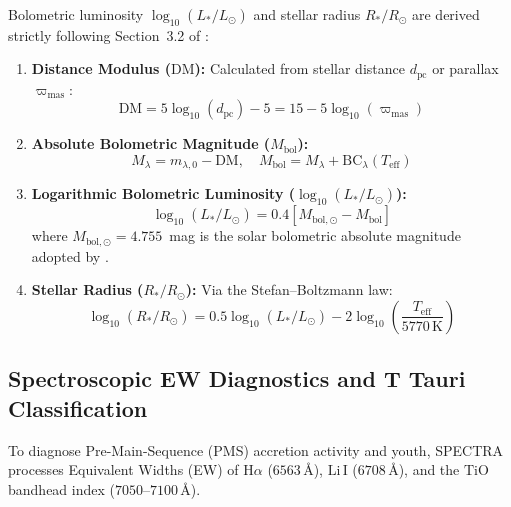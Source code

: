 \documentclass[fleqn,usenatbib]{mnras}
\begin{document}
Bolometric luminosity $\log_{10}(L_*/L_\odot)$ and stellar radius $R_*/R_\odot$ are derived strictly following Section~3.2 of \citet{bell2014pre}:
\begin{enumerate}
    \item \textbf{Distance Modulus ($\text{DM}$):} Calculated from stellar distance $d_{\text{pc}}$ or parallax $\varpi_{\text{mas}}$:
    \begin{equation}
        \text{DM} = 5 \log_{10}(d_{\text{pc}}) - 5 = 15 - 5 \log_{10}(\varpi_{\text{mas}})
        \label{eq:dm}
    \end{equation}
    \item \textbf{Absolute Bolometric Magnitude ($M_{\text{bol}}$):}
    \begin{equation}
        M_\lambda = m_{\lambda,0} - \text{DM}, \quad M_{\text{bol}} = M_\lambda + \text{BC}_\lambda(T_{\text{eff}})
        \label{eq:mbol}
    \end{equation}
    \item \textbf{Logarithmic Bolometric Luminosity ($\log_{10}(L_*/L_\odot)$):}
    \begin{equation}
        \log_{10}(L_*/L_\odot) = 0.4 \left[ M_{\text{bol},\odot} - M_{\text{bol}} \right]
        \label{eq:logl}
    \end{equation}
    where $M_{\text{bol},\odot} = 4.755$~mag is the solar bolometric absolute magnitude adopted by \citet{bell2014pre}.
    \item \textbf{Stellar Radius ($R_*/R_\odot$):} Via the Stefan--Boltzmann law:
    \begin{equation}
        \log_{10}(R_*/R_\odot) = 0.5 \log_{10}(L_*/L_\odot) - 2 \log_{10}\left( \frac{T_{\text{eff}}}{5770\,\text{K}} \right)
        \label{eq:radius}
    \end{equation}
\end{enumerate}


\subsection{Spectroscopic EW Diagnostics and T Tauri Classification}
\label{sec:spectroscopic}

To diagnose Pre-Main-Sequence (PMS) accretion activity and youth, \textsc{SPECTRA} processes Equivalent Widths (EW) of $\text{H}\alpha$ ($6563\,\text{\AA}$), $\text{Li}\,\text{I}$ ($6708\,\text{\AA}$), and the $\text{TiO}$ bandhead index ($7050\text{--}7100\,\text{\AA}$).
\end{document}
